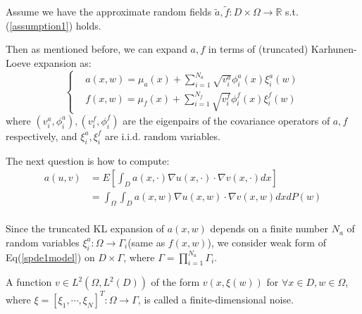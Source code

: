 Assume we have the approximate random fields $\tilde{a}, \tilde{f}: D\times \Omega \to \mathbb{R}$ s.t. (\ref{assumption1}) holds.

Then as mentioned before, we can expand $a, f$ in terms of (truncated) Karhunen-Loeve expansion as:
\begin{equation}\left\{
    \begin{aligned}
        &a(x, w) = \mu_a(x) + \sum_{i=1}^{N_a}\sqrt{v_i^a}\phi_i^a(x)\xi_i^a(w)\\
        &f(x, w) = \mu_f(x) + \sum_{i=1}^{N_f}\sqrt{v_i^f}\phi_i^f(x)\xi_i^f(w)
    \end{aligned}\right.\label{expansion}
\end{equation}
where $(v_i^a, \phi_i^a), (v_i^f, \phi_i^f)$ are the eigenpairs of the covariance operators of $a, f$ respectively, 
and $\xi_i^a, \xi_i^f$ are i.i.d. random variables.

The next question is how to compute:
\begin{equation}
    \begin{aligned}
        a(u, v) &= E\left[\int_D a(x, \cdot)\nabla u(x, \cdot)\cdot \nabla v(x, \cdot)dx\right]\\
        &=\int_\Omega \int_D a(x, w)\nabla u(x, w)\cdot \nabla v(x, w)dxdP(w)\\
    \end{aligned}
\end{equation}

Since the truncated KL expansion of $a(x, w)$ depends on a finite number $N_a$ of random variables $\xi_i^a:\Omega\to \Gamma_i$(same as $f(x,w)$), 
we consider weak form of Eq(\ref{spde1model}) on $D\times \Gamma$, where $\Gamma = \prod_{i=1}^{N_a}\Gamma_i$.

\begin{definition}
    A function $v\in L^2(\Omega, L^2(D))$ of the form $v(x, \xi(w))$ for $\forall x\in D,w\in \Omega$, where $\xi = [\xi_1, \cdots, \xi_{N}]^T:\Omega\to \Gamma$, is called a finite-dimensional noise.
\end{definition}

